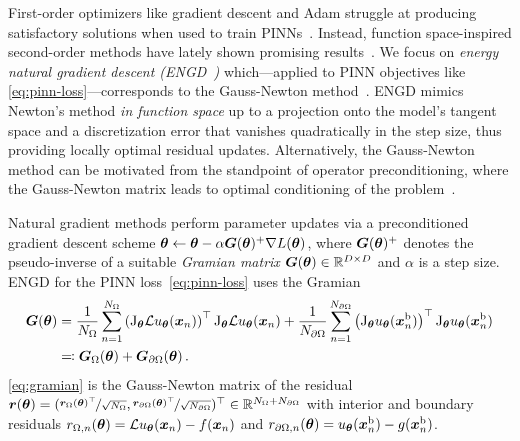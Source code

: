 First-order optimizers like gradient descent and Adam struggle at producing satisfactory solutions when used to train PINNs~\citep{cuomo2022scientific}.
Instead, function space-inspired second-order methods have lately shown promising results~\citep{muller2024optimization}.
We focus on \emph{energy natural gradient descent (ENGD~\cite{muller2023achieving})} which---applied to PINN objectives like \eqref{eq:pinn-loss}---corresponds to the Gauss-Newton method~\cite[][Chapter 6.3]{bottou2016machine}.
ENGD mimics Newton's method \emph{in function space} up to a projection onto the model's tangent space and a discretization error that vanishes quadratically in the step size, thus providing locally optimal residual updates.
Alternatively, the Gauss-Newton method can be motivated from the standpoint of operator preconditioning, where the Gauss-Newton matrix leads to optimal conditioning of the problem~\citep{de2023operator}.

Natural gradient methods perform parameter updates via a preconditioned gradient descent scheme ${\bm{\theta}} \leftarrow {\bm{\theta}} - \alpha {\bm{G}}({\bm{\theta}})^+\nabla L({\bm{\theta}})$, where ${\bm{G}}({\bm{\theta}})^+$ denotes the pseudo-inverse of a suitable \emph{Gramian matrix} ${\bm{G}}({\bm{\theta}}) \in {\mathbb{R}}^{D \times D}$ and $\alpha$ is a step size.
ENGD for the PINN loss~\eqref{eq:pinn-loss} uses the Gramian
\begin{align}\label{eq:gramian}
  \begin{split}
    {\bm{G}}({\bm{\theta}})
    &=
      \frac{1}{N_\Omega}
      \sum_{n=1}^{N_\Omega}
      \left( \mathrm{J}_{{\bm{\theta}}} \mathcal{L} u_{\bm{\theta}}({\bm{x}}_n) \right)^\top
      \mathrm{J}_{{\bm{\theta}}} \mathcal{L} u_{\bm{\theta}}({\bm{x}}_n)
      +
      \frac{1}{N_{\partial\Omega}}
      \sum_{n=1}^{N_{\partial\Omega}}
      \left(\mathrm{J}_{{\bm{\theta}}} u_{\bm{\theta}}({\bm{x}}_n^\text{b})  \right)^\top
      \mathrm{J}_{{\bm{\theta}}} u_{\bm{\theta}} ({\bm{x}}_n^\text{b})
    \\
    &\eqqcolon {\bm{G}}_\Omega({\bm{\theta}}) + {\bm{G}}_{\partial\Omega}({\bm{\theta}})\,.
  \end{split}
\end{align}
\eqref{eq:gramian} is the Gauss-Newton matrix of the residual ${\bm{r}}({\bm{\theta}}) = (\nicefrac{{\bm{r}}_\Omega({\bm{\theta}})^{\top}}{\sqrt{N_\Omega}}, \nicefrac{{\bm{r}}_{\partial\Omega}({\bm{\theta}})^{\top}}{\sqrt{N_{\partial\Omega}}} )^\top \in {\mathbb{R}}^{N_{\Omega} + N_{\partial\Omega}}$ with interior and boundary residuals $r_{\Omega,n}({\bm{\theta}}) = \mathcal{L} u_{\bm{\theta}}({\bm{x}}_n) - f({\bm{x}}_n)$ and $r_{\partial\Omega,n}({\bm{\theta}}) = u_{\bm{\theta}}({\bm{x}}_n^\text{b}) - g({\bm{x}}_n^\text{b})$.


